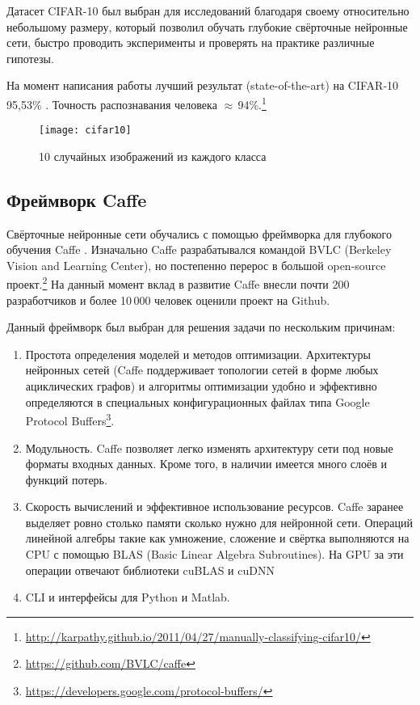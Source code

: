Датасет CIFAR-10 \cite{learningmultiple} был выбран для исследований благодаря своему относительно небольшому размеру, 
который позволил обучать глубокие свёрточные нейронные сети, быстро проводить эксперименты и проверять на практике различные гипотезы.

На момент написания работы лучший результат (state-of-the-art) на CIFAR-10 95,53\% \cite{2014arXiv1412}. Точность  
распознавания человека $\approx$\,94\%.\footnote{\url{http://karpathy.github.io/2011/04/27/manually-classifying-cifar10/}}

\begin{figure}[H]
\centering
\texttt{[image: cifar10]}
\caption{10 случайных изображений из каждого класса}
\end{figure}

\subsection{Фреймворк Caffe}
Свёрточные нейронные сети обучались с помощью фреймворка для глубокого обучения Caffe \cite{jia2014caffe}.
Изначально Caffe разрабатывался командой BVLC (Berkeley Vision and Learning Center), но постепенно перерос в большой 
open-source проект.\footnote{\url{https://github.com/BVLC/caffe}} На данный момент вклад в развитие Caffe внесли почти 200 
разработчиков и более 10\,000 человек оценили проект на Github.

Данный фреймворк был выбран для решения задачи по нескольким причинам:
\begin{enumerate}
    \item Простота определения моделей и методов оптимизации. Архитектуры нейронных сетей
    (Caffe поддерживает топологии сетей в форме любых ациклических графов) и алгоритмы оптимизации удобно и 
    эффективно определяются в специальных конфигурационных файлах типа Google Protocol 
    Buffers\footnote{\url{https://developers.google.com/protocol-buffers/}}. 
    \item Модульность. Caffe позволяет легко изменять архитектуру сети под новые форматы входных данных. Кроме того, в наличии 
    имеется много слоёв и функций потерь.
    \item Скорость вычислений и эффективное использование ресурсов. Caffe заранее выделяет ровно столько памяти сколько нужно для 
    нейронной сети. Операций линейной алгебры такие как умножение, сложение и свёртка выполняются на CPU с помощью BLAS (Basic 
    Linear Algebra Subroutines). На GPU за эти операции отвечают библиотеки cuBLAS и cuDNN 
    \cite{DBLP:journals/corr/ChetlurWVCTCS14}
    \item CLI и интерфейсы для Python и Matlab.
\end{enumerate}

